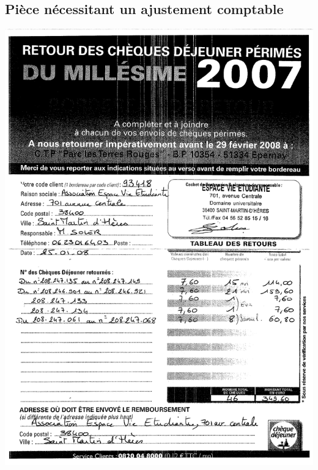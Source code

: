 \subsection{Pièce nécessitant un ajustement comptable}
\begin{center}
\includegraphics[scale=0.7]{annexes/images/chequedejeuner_retour.pdf}
\end{center}


